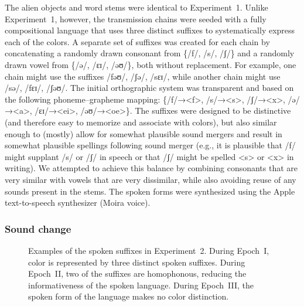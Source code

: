 \documentclass[doc,biblatex]{apa7}
\begin{document}
The alien objects and word stems were identical to Experiment~1. Unlike Experiment~1, however, the transmission chains were seeded with a fully compositional language that uses three distinct suffixes to systematically express each of the colors. A separate set of suffixes was created for each chain by concatenating a randomly drawn consonant from \{/f/, /s/, /ʃ/\} and a randomly drawn vowel from \{/ə/, /ɛɪ/, /əʊ/\}, both without replacement. For example, one chain might use the suffixes /fəʊ/, /ʃə/, /sɛɪ/, while another chain might use /sə/, /fɛɪ/, /ʃəʊ/. The initial orthographic system was transparent and based on the following phoneme–grapheme mapping: \{/f/→<f>, /s/→<s>, /ʃ/→<x>, /ə/→<a>, /ɛɪ/→<ei>, /əʊ/→<oe>\}. The suffixes were designed to be distinctive (and therefore easy to memorize and associate with colors), but also similar enough to (mostly) allow for somewhat plausible sound mergers and result in somewhat plausible spellings following sound merger (e.g., it is plausible that /f/ might supplant /s/ or /ʃ/ in speech or that /ʃ/ might be spelled <s> or <x> in writing). We attempted to achieve this balance by combining consonants that are very similar with vowels that are very dissimilar, while also avoiding reuse of any sounds present in the stems. The spoken forms were synthesized using the Apple text-to-speech synthesizer (Moira voice).

\subsubsection{Sound change}

	\begin{figure}
	\vspace*{2pt}
	\caption{Examples of the spoken suffixes in Experiment~2. During Epoch~I, color is represented by three distinct spoken suffixes. During Epoch~II, two of the suffixes are homophonous, reducing the informativeness of the spoken language. During Epoch~III, the spoken form of the language makes no color distinction.}
	\label{sound_change}
	\end{figure}
\end{document}

